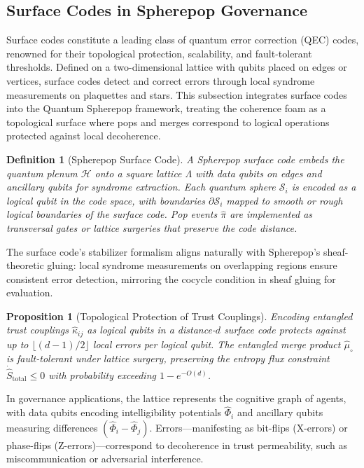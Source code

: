 \documentclass[12pt]{article}
\newtheorem{definition}{Definition}
\newtheorem{proposition}{Proposition}
\begin{document}
\subsection{Surface Codes in Spherepop Governance}
Surface codes constitute a leading class of quantum error correction (QEC) codes, renowned for their topological protection, scalability, and fault-tolerant thresholds. Defined on a two-dimensional lattice with qubits placed on edges or vertices, surface codes detect and correct errors through local syndrome measurements on plaquettes and stars. This subsection integrates surface codes into the Quantum Spherepop framework, treating the coherence foam as a topological surface where pops and merges correspond to logical operations protected against local decoherence.

\begin{definition}[Spherepop Surface Code]
A \emph{Spherepop surface code} embeds the quantum plenum \(\mathcal{H}\) onto a square lattice \(\Lambda\) with data qubits on edges and ancillary qubits for syndrome extraction. Each quantum sphere \(\mathcal{S}_i\) is encoded as a logical qubit in the code space, with boundaries \(\partial \mathcal{S}_i\) mapped to smooth or rough logical boundaries of the surface code. Pop events \(\hat{\pi}\) are implemented as transversal gates or lattice surgeries that preserve the code distance.
\end{definition}

The surface code's stabilizer formalism aligns naturally with Spherepop's sheaf-theoretic gluing: local syndrome measurements on overlapping regions ensure consistent error detection, mirroring the cocycle condition in sheaf gluing for evaluation.

\begin{proposition}[Topological Protection of Trust Couplings]
Encoding entangled trust couplings \(\hat{\kappa}_{ij}\) as logical qubits in a distance-\(d\) surface code protects against up to \(\lfloor (d-1)/2 \rfloor\) local errors per logical qubit. The entangled merge product \(\hat{\mu}_{\circ}\) is fault-tolerant under lattice surgery, preserving the entropy flux constraint \(\dot{\hat{S}}_{\text{total}} \leq 0\) with probability exceeding \(1 - e^{-O(d)}\).
\end{proposition}

In governance applications, the lattice represents the cognitive graph of agents, with data qubits encoding intelligibility potentials \(\hat{\Phi}_i\) and ancillary qubits measuring differences \((\hat{\Phi}_i - \hat{\Phi}_j)\). Errors—manifesting as bit-flips (X-errors) or phase-flips (Z-errors)—correspond to decoherence in trust permeability, such as miscommunication or adversarial interference.
\end{document}
